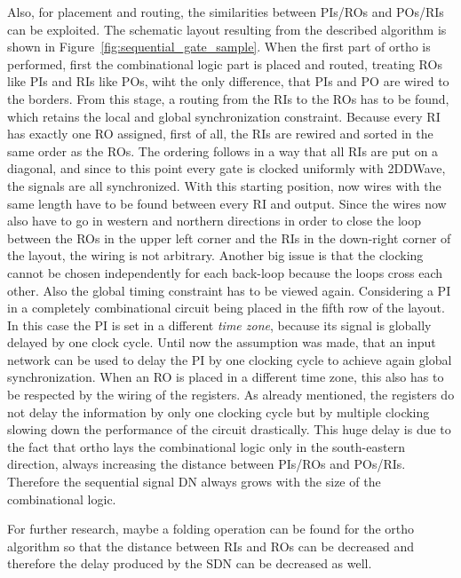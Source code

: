 Also, for placement and routing, the similarities between PIs/ROs and POs/RIs can be exploited. The schematic layout resulting from the described algorithm is shown in Figure~\ref{fig:sequential_gate_sample}. When the first part of ortho is performed, first the combinational logic part is placed and routed, treating ROs like PIs and RIs like POs, wiht the only difference, that PIs and PO are wired to the borders. From this stage, a routing from the RIs to the ROs has to be found, which retains the local and global synchronization constraint. Because every RI has exactly one RO assigned, first of all, the RIs are rewired and sorted in the same order as the ROs. The ordering follows in a way that all RIs are put on a diagonal, and since to this point every gate is clocked uniformly with 2DDWave, the signals are all synchronized. With this starting position, now wires with the same length have to be found between every RI and output. Since the wires now also have to go in western and northern directions in order to close the loop between the ROs in the upper left corner and the RIs in the down-right corner of the layout, the wiring is not arbitrary. Another big issue is that the clocking cannot be chosen independently for each back-loop because the loops cross each other. Also the global timing constraint has to be viewed again. Considering a PI in a completely combinational circuit being placed in the fifth row of the layout. In this case the PI is set in a different \textit{time zone}, because its signal is globally delayed by one clock cycle. Until now the assumption was made, that an input network can be used to delay the PI by one clocking cycle to achieve again global synchronization. When an RO is placed in a different time zone, this also has to be respected by the wiring of the registers. As already mentioned, the registers do not delay the information by only one clocking cycle but by multiple clocking slowing down the performance of the circuit drastically. This huge delay is due to the fact that ortho lays the combinational logic only in the south-eastern direction, always increasing the distance between PIs/ROs and POs/RIs. Therefore the sequential signal DN always grows with the size of the combinational logic.

For further research, maybe a folding operation can be found for the ortho algorithm so that the distance between RIs and ROs can be decreased and therefore the delay produced by the SDN can be decreased as well.

